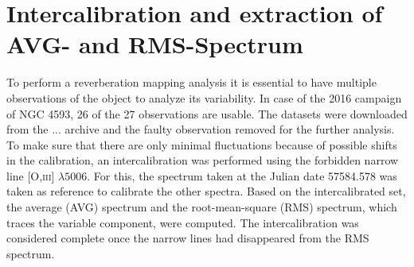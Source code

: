 \newpage

\section{Intercalibration and extraction of AVG- and RMS-Spectrum}

To perform a reverberation mapping analysis it is essential to have multiple observations of the object to analyze its variability. In case of the 2016 campaign of NGC 4593, 26 of the 27 observations are usable. The datasets were downloaded from the ... archive and the faulty observation removed for the further analysis.\\
To make sure that there are only minimal fluctuations because of possible shifts in the calibration, an intercalibration was performed using the forbidden narrow line [O,\textsc{iii}] $\lambda5006$. For this, the spectrum taken at the Julian date 57584.578 was taken as reference to calibrate the other spectra. Based on the intercalibrated set, the average (AVG) spectrum and the root-mean-square (RMS) spectrum, which traces the variable component, were computed. The intercalibration was considered complete once the narrow lines had disappeared from the RMS spectrum. 
